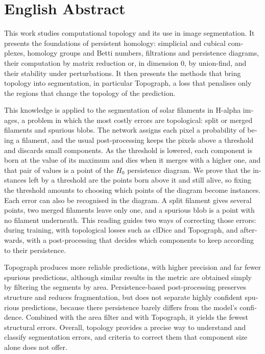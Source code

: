 \chapter*{English Abstract}
\enlargethispage{3\baselineskip}

\begin{otherlanguage}{english}
This work studies computational topology and its use in image
segmentation. It presents the foundations of persistent homology:
simplicial and cubical complexes, homology groups and Betti numbers,
filtrations and persistence diagrams, their computation by matrix
reduction or, in dimension $0$, by union-find, and their stability
under perturbations. It then presents
the methods
that bring topology into segmentation, in particular Topograph, a loss
that penalises only the regions that change the topology of the
prediction.

This knowledge is applied to the segmentation of solar filaments in
H-alpha images, a problem in which the most costly errors are
topological: split or merged filaments and spurious blobs. The network assigns
each pixel a probability of being a filament, and the usual
post-processing keeps the pixels above a threshold and discards small
components. As the threshold is lowered, each component is born at the
value of its maximum and dies when it merges with a higher one, and
that pair of values is a point of the $H_0$ persistence diagram. We
prove that the instances left by a threshold are the points born above
it and still alive, so fixing the threshold amounts to choosing which
points of the diagram become instances. Each error can also be
recognised in the diagram. A split filament gives several points, two
merged filaments leave only one, and a spurious blob is a point with no
filament underneath. This reading guides two ways of
correcting those errors: during training, with topological losses such
as clDice and Topograph, and afterwards, with a post-processing that
decides which components to keep according to their persistence.

Topograph produces more reliable predictions, with higher precision and
far fewer spurious predictions, although similar results in the metric
are obtained simply by filtering the segments by area. Persistence-based
post-processing preserves structure and reduces fragmentation, but does
not separate highly confident spurious predictions, because there
persistence barely differs from the model's confidence. Combined with the
area filter and with Topograph, it yields the fewest structural errors. Overall, topology provides a precise
way to understand and classify segmentation errors, and criteria to
correct them that component size alone does not offer.
\end{otherlanguage}
